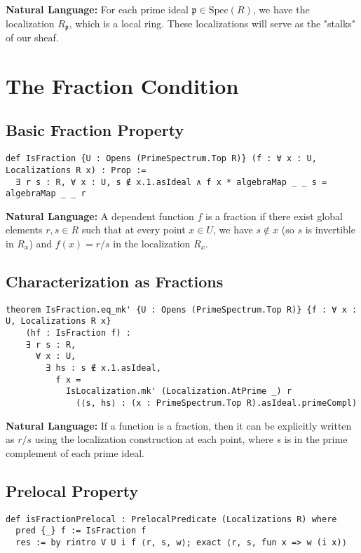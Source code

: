 \documentclass{article}
\theoremstyle{definition}
\begin{document}
\textbf{Natural Language:} For each prime ideal $\mathfrak{p} \in \mathrm{Spec}(R)$, we have the localization $R_\mathfrak{p}$, which is a local ring. These localizations will serve as the "stalks" of our sheaf.

\section{The Fraction Condition}

\subsection{Basic Fraction Property}

\begin{lstlisting}
def IsFraction {U : Opens (PrimeSpectrum.Top R)} (f : ∀ x : U, Localizations R x) : Prop :=
  ∃ r s : R, ∀ x : U, s ∉ x.1.asIdeal ∧ f x * algebraMap _ _ s = algebraMap _ _ r
\end{lstlisting}

\textbf{Natural Language:} A dependent function $f$ is a fraction if there exist global elements $r, s \in R$ such that at every point $x \in U$, we have $s \notin x$ (so $s$ is invertible in $R_x$) and $f(x) = r/s$ in the localization $R_x$.

\subsection{Characterization as Fractions}

\begin{lstlisting}
theorem IsFraction.eq_mk' {U : Opens (PrimeSpectrum.Top R)} {f : ∀ x : U, Localizations R x}
    (hf : IsFraction f) :
    ∃ r s : R,
      ∀ x : U,
        ∃ hs : s ∉ x.1.asIdeal,
          f x =
            IsLocalization.mk' (Localization.AtPrime _) r
              (⟨s, hs⟩ : (x : PrimeSpectrum.Top R).asIdeal.primeCompl)
\end{lstlisting}

\textbf{Natural Language:} If a function is a fraction, then it can be explicitly written as $r/s$ using the localization construction at each point, where $s$ is in the prime complement of each prime ideal.

\subsection{Prelocal Property}

\begin{lstlisting}
def isFractionPrelocal : PrelocalPredicate (Localizations R) where
  pred {_} f := IsFraction f
  res := by rintro V U i f ⟨r, s, w⟩; exact ⟨r, s, fun x => w (i x)⟩
\end{lstlisting}
\end{document}
